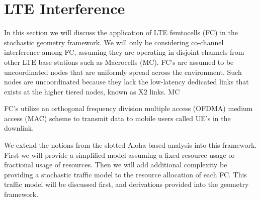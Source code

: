 \section{LTE Interference}
%
In this section we will discuss the application of LTE femtocells (FC) in the stochastic geometry framework.  We will only be considering co-channel interference among FC, assuming they are operating in disjoint channels from other LTE base stations such as Macrocells (MC).  FC's are assumed to be uncoordinated nodes that are uniformly spread across the environment.  Such nodes are uncoordinated because they lack the low-latency dedicated links that exists at the higher tiered nodes, known as X2 links.  MC
%
%
\par
%
FC's utilize an orthogonal frequency division multiple access (OFDMA) medium access (MAC) scheme to transmit data to mobile users called UE's in the downlink.
%
\par
%
We extend the notions from the slotted Aloha based analysis into this framework.  First we will provide a simplified model assuming a fixed resource usage or fractional usage of resources.  Then we will add additional complexity be providing a stochastic traffic model to the resource allocation of each FC.  This traffic model will be discussed first, and derivations provided into the geometry framework.

